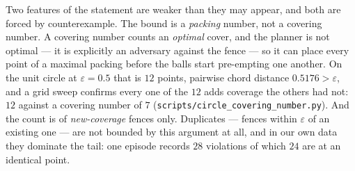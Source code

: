 \documentclass[11pt]{article}
\theoremstyle{definition}
\theoremstyle{remark}
\begin{document}
Two features of the statement are weaker than they may appear, and both are forced by counterexample. The bound is a \emph{packing} number, not a covering number. A covering number counts an \emph{optimal} cover, and the planner is not optimal --- it is explicitly an adversary against the fence --- so it can place every point of a maximal packing before the balls start pre-empting one another. On the unit circle at $\varepsilon = 0.5$ that is $12$ points, pairwise chord distance $0.5176 > \varepsilon$, and a grid sweep confirms every one of the $12$ adds coverage the others had not: $12$ against a covering number of $7$ (\texttt{scripts/\allowbreak circle\_\allowbreak covering\_\allowbreak number.py}). And the count is of \emph{new-coverage} fences only. Duplicates --- fences within $\varepsilon$ of an existing one --- are not bounded by this argument at all, and in our own data they dominate the tail: one episode records $28$ violations of which $24$ are at an identical point.
\end{document}
